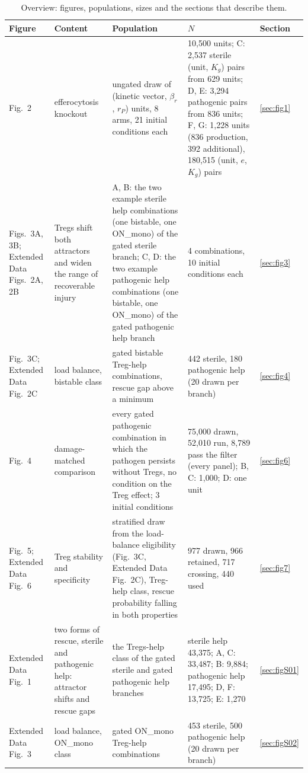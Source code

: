 \documentclass[11pt]{article}
\newcommand{\bros}{\beta_r}
\begin{document}
\begin{table}[H]
\centering
\caption{Overview: figures, populations, sizes and the sections that describe them.}
\label{tab:overview}
\footnotesize
\begin{tabularx}{\linewidth}{@{}l L L L l@{}}
\toprule
Figure & Content & Population & $N$ & Section\\\midrule
Fig.~2 & efferocytosis knockout & ungated draw of (kinetic vector, $\bros$, $r_P$) units, 8 arms, 21 initial conditions each & 10{,}500 units; C: 2{,}537 sterile (unit, $K_g$) pairs from 629 units; D, E: 3{,}294 pathogenic pairs from 836 units; F, G: 1{,}228 units (836 production, 392 additional), 180{,}515 (unit, $e$, $K_g$) pairs & \ref{sec:fig1}\\
Figs.~3A, 3B; Extended Data Figs.~2A, 2B & Tregs shift both attractors and widen the range of recoverable injury & A, B: the two example sterile help combinations (one bistable, one ON\_mono) of the gated sterile branch; C, D: the two example pathogenic help combinations (one bistable, one ON\_mono) of the gated pathogenic help branch & 4 combinations, 10 initial conditions each & \ref{sec:fig3}\\
Fig.~3C; Extended Data Fig.~2C & load balance, bistable class & gated bistable Treg-help combinations, rescue gap above a minimum & 442 sterile, 180 pathogenic help (20 drawn per branch) & \ref{sec:fig4}\\
Fig.~4 & damage-matched comparison & every gated pathogenic combination in which the pathogen persists without Tregs, no condition on the Treg effect; 3 initial conditions & 75{,}000 drawn, 52{,}010 run, 8{,}789 pass the filter (every panel); B, C: 1{,}000; D: one unit & \ref{sec:fig6}\\
Fig.~5; Extended Data Fig.~6 & Treg stability and specificity & stratified draw from the load-balance eligibility (Fig.~3C, Extended Data Fig.~2C), Treg-help class, rescue probability falling in both properties & 977 drawn, 966 retained, 717 crossing, 440 used & \ref{sec:fig7}\\
Extended Data Fig.~1 & two forms of rescue, sterile and pathogenic help: attractor shifts and rescue gaps & the Tregs-help class of the gated sterile and gated pathogenic help branches & sterile help 43{,}375; A, C: 33{,}487; B: 9{,}884; pathogenic help 17{,}495; D, F: 13{,}725; E: 1{,}270 & \ref{sec:figS01}\\
Extended Data Fig.~3 & load balance, ON\_mono class & gated ON\_mono Treg-help combinations & 453 sterile, 500 pathogenic help (20 drawn per branch) & \ref{sec:figS02}\\

\end{tabularx}
\end{table}
\end{document}

